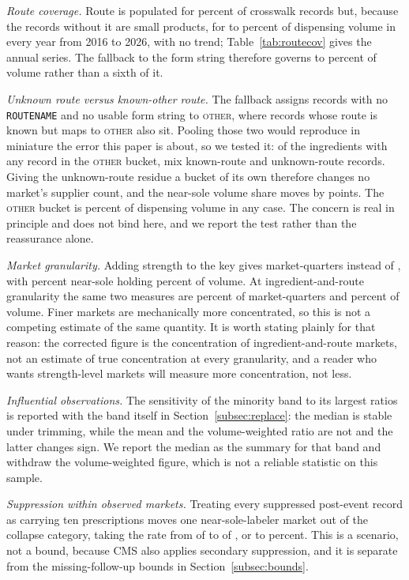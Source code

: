 \documentclass[pdflatex,sn-vancouver-num,Numbered]{sn-jnl}
\begin{document}
\emph{Route coverage.} Route is populated for \nRouteCovRec percent of crosswalk records but, because the
records without it are small products, for \nRouteCovLo to \nRouteCovHi percent of dispensing volume in every
year from 2016 to 2026, with no trend; Table~\ref{tab:routecov} gives the annual series. The
fallback to the form string therefore governs \nRouteFallbackLo to \nRouteFallbackHi percent of
volume rather than a sixth of it.

\emph{Unknown route versus known-other route.} The fallback assigns records with no
\texttt{ROUTENAME} and no usable form string to \textsc{other}, where records whose route is
known but maps to \textsc{other} also sit. Pooling those two would reproduce in miniature the
error this paper is about, so we tested it: of the \nRUIngredients ingredients with any record in
the \textsc{other} bucket, \nRUMixedW mix known-route and unknown-route records. Giving the
unknown-route residue a bucket of its own therefore changes no market's supplier count, and the
near-sole volume share moves by \nRUNearSoleDelta points. The \textsc{other} bucket is
\nRUOtherVol percent of dispensing volume in any case. The concern is real in principle and does
not bind here, and we report the test rather than the reassurance alone.

\emph{Market granularity.} Adding strength to the key gives \nStrengthMQ market-quarters instead of
\nNormMQ, with \nStrengthNearSole percent near-sole holding
\nStrengthNearSoleVol percent of volume. At ingredient-and-route granularity the same two
measures are \nNearSoleMQPctC percent of market-quarters and \nNearSoleVolC percent of volume. Finer markets are mechanically more
concentrated, so this is not a competing estimate of the same quantity. It is worth stating
plainly for that reason: the corrected figure is the concentration of ingredient-and-route
markets, not an estimate of true concentration at every granularity, and a reader who wants
strength-level markets will measure more concentration, not less.

\emph{Influential observations.} The sensitivity of the minority band to its largest ratios is reported with the band itself in Section~\ref{subsec:replace}: the median is stable under trimming, while the mean and the volume-weighted ratio are not and the latter changes sign. We report the median as the summary for that band and withdraw the volume-weighted figure, which is not a reliable statistic on this sample.

\emph{Suppression within observed markets.} Treating every suppressed post-event record as
carrying ten prescriptions moves one near-sole-labeler market out of the collapse category, taking the
rate from \nSuppPrimColl of \nSuppScenN to \nSuppScenColl of \nSuppScenN, or \nSuppPrimary to \nSuppressionScenario percent. This is a scenario, not a bound, because
CMS also applies secondary suppression, and it is separate from the missing-follow-up bounds in
Section~\ref{subsec:bounds}.
\end{document}
